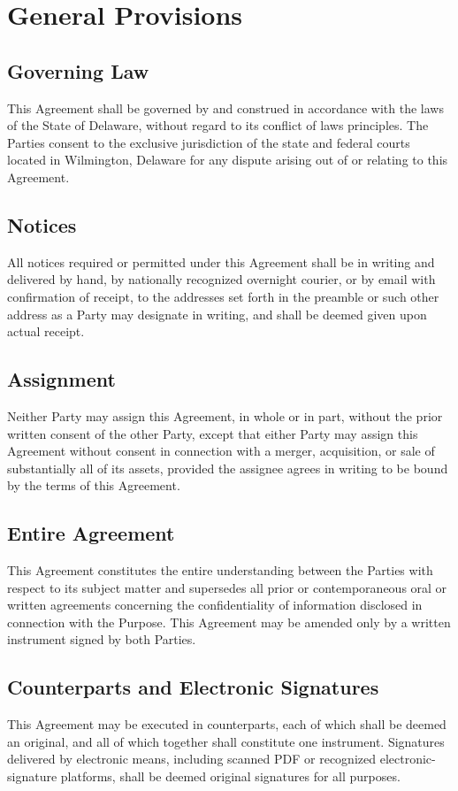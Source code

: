 \section{General Provisions}

\subsection{Governing Law} This Agreement shall be governed by and construed in accordance with the laws of the State of Delaware, without regard to its conflict of laws principles. The Parties consent to the exclusive jurisdiction of the state and federal courts located in Wilmington, Delaware for any dispute arising out of or relating to this Agreement.

\subsection{Notices} All notices required or permitted under this Agreement shall be in writing and delivered by hand, by nationally recognized overnight courier, or by email with confirmation of receipt, to the addresses set forth in the preamble or such other address as a Party may designate in writing, and shall be deemed given upon actual receipt.

\subsection{Assignment} Neither Party may assign this Agreement, in whole or in part, without the prior written consent of the other Party, except that either Party may assign this Agreement without consent in connection with a merger, acquisition, or sale of substantially all of its assets, provided the assignee agrees in writing to be bound by the terms of this Agreement.

\subsection{Entire Agreement} This Agreement constitutes the entire understanding between the Parties with respect to its subject matter and supersedes all prior or contemporaneous oral or written agreements concerning the confidentiality of information disclosed in connection with the Purpose. This Agreement may be amended only by a written instrument signed by both Parties.

\subsection{Counterparts and Electronic Signatures} This Agreement may be executed in counterparts, each of which shall be deemed an original, and all of which together shall constitute one instrument. Signatures delivered by electronic means, including scanned PDF or recognized electronic-signature platforms, shall be deemed original signatures for all purposes.


